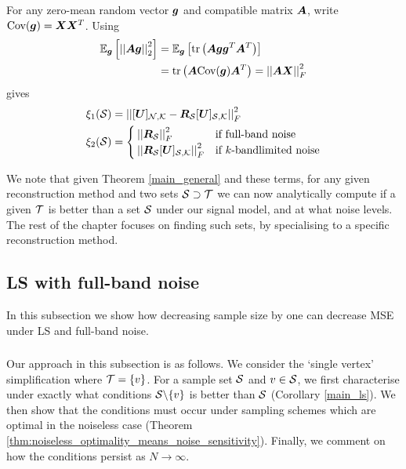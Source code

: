 For any zero-mean random vector $\bm{g}$ and compatible matrix $\bm{A}$, write $\text{Cov}(\bm{g}) = \bm{X}\bm{X}^{T}$. Using 
\begin{align}
    \expect[\vect{g}]{\sqnormvec{\matr{A}\vect{g}}} &= \expect[\vect{g}]{\trace{\matr{A}\vect{g}\vect{g}^{T}\matr{A}^{T}}} \\
    &= \trace{\matr{A}\text{Cov}(\vect{g})\matr{A}^{T}} = \sqfrob{\matr{A}\matr{X}}
\end{align} gives
\begin{align}
    \xi_{1}(\set{S}) &= \sqfrob{\matrsubU{N} - \matr{R}_{\set{S}}\matrsubU{S}} \label{eq:xi_1_def} \\
    \xi_{2}(\set{S}) &= \begin{cases}
        \sqfrob{\matr{R}_{\set{S}}} &\text{if full-band noise} \label{eq:xi_2_def} \\
\sqfrob{\matr{R}_{\set{S}}\matrsubU{S}} &\text{if }k\textrm{-bandlimited noise} 
    \end{cases}
\end{align}

We note that given Theorem \ref{main_general} and these terms, for any given reconstruction method and two sets $\mathcal{S} \supset \mathcal{T}$ we can now analytically compute if a given $\mathcal{T}$ is better than a set $\mathcal{S}$ under our signal model, and at what noise levels. The rest of the chapter focuses on finding such sets, by specialising to a specific reconstruction method.

\subsection{LS with full-band noise}
\label{sec:LS_full_band}
In this subsection we show how decreasing sample size by one can decrease MSE under LS and full-band noise. 


\subsubsection{}
Our approach in this subsection is as follows. We consider the `single vertex' simplification where $\mathcal{T} = \{v\}$. For a sample set $\mathcal{S}$ and $v\in\mathcal{S}$, we first characterise under exactly what conditions $\mathcal{S} \backslash \{v\}$ is better than $\mathcal{S}$ (Corollary \ref{main_ls}). We then show that the conditions must occur under sampling schemes which are optimal in the noiseless case (Theorem \ref{thm:noiseless_optimality_means_noise_sensitivity}). Finally, we comment on how the conditions persist as $N \to \infty$.

